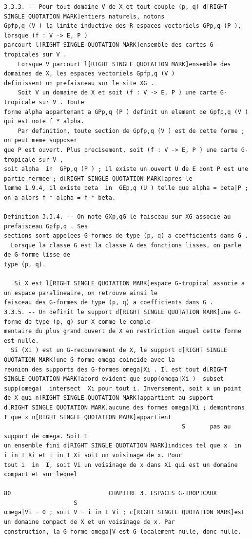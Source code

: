 \documentclass[
  11pt,
]{article}
\begin{document}
\begin{lstlisting}
3.3.3. -- Pour tout domaine V de X et tout couple (p, q) d[RIGHT SINGLE QUOTATION MARK]entiers naturels, notons
Gpfp,q (V ) la limite inductive des R-espaces vectoriels GPp,q (P ), lorsque (f : V -> E, P )
parcourt l[RIGHT SINGLE QUOTATION MARK]ensemble des cartes G-tropicales sur V .
    Lorsque V parcourt l[RIGHT SINGLE QUOTATION MARK]ensemble des domaines de X, les espaces vectoriels Gpfp,q (V )
definissent un prefaisceau sur le site XG .
    Soit V un domaine de X et soit (f : V -> E, P ) une carte G-tropicale sur V . Toute
forme alpha appartenant a GPp,q (P ) definit un element de Gpfp,q (V ) qui est note f * alpha.
    Par definition, toute section de Gpfp,q (V ) est de cette forme ; on peut meme supposer
que P est ouvert. Plus precisement, soit (f : V -> E, P ) une carte G-tropicale sur V ,
soit alpha  in  GPp,q (P ) ; il existe un ouvert U de E dont P est une partie fermee ; d[RIGHT SINGLE QUOTATION MARK]apres le
lemme 1.9.4, il existe beta  in  GEp,q (U ) telle que alpha = beta|P ; on a alors f * alpha = f * beta.

Definition 3.3.4. -- On note GXp,qG le faisceau sur XG associe au prefaisceau Gpfp,q . Ses
sections sont appelees G-formes de type (p, q) a coefficients dans G .
  Lorsque la classe G est la classe A des fonctions lisses, on parle de G-forme lisse de
type (p, q).

   Si X est l[RIGHT SINGLE QUOTATION MARK]espace G-tropical associe a un espace paralineaire, on retrouve ainsi le
faisceau des G-formes de type (p, q) a coefficients dans G .
3.3.5. -- On definit le support d[RIGHT SINGLE QUOTATION MARK]une G-forme de type (p, q) sur X comme le comple-
mentaire du plus grand ouvert de X en restriction auquel cette forme est nulle.
  Si (Xi ) est un G-recouvrement de X, le support d[RIGHT SINGLE QUOTATION MARK]une G-forme omega coincide avec la
reunion des supports des G-formes omega|Xi . Il est tout d[RIGHT SINGLE QUOTATION MARK]abord evident que supp(omega|Xi )  subset 
supp(omega)  intersect  Xi pour tout i. Inversement, soit x un point de X qui n[RIGHT SINGLE QUOTATION MARK]appartient au support
d[RIGHT SINGLE QUOTATION MARK]aucune des formes omega|Xi ; demontrons T que x n[RIGHT SINGLE QUOTATION MARK]appartient
                                                   S       pas au support de omega. Soit I
un ensemble fini d[RIGHT SINGLE QUOTATION MARK]indices tel que x  in  i in I Xi et i in I Xi soit un voisinage de x. Pour
tout i  in  I, soit Vi un voisinage de x dans Xi qui est un domaine compact et sur lequel

80                            CHAPITRE 3. ESPACES G-TROPICAUX
                    S
omega|Vi = 0 ; soit V = i in I Vi ; c[RIGHT SINGLE QUOTATION MARK]est un domaine compact de X et un voisinage de x. Par
construction, la G-forme omega|V est G-localement nulle, donc nulle.


\end{lstlisting}
\end{document}
